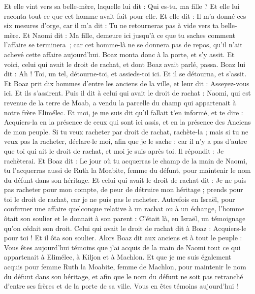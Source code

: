 \begin{multicols}{2}
Et elle vint vers sa belle-mère, laquelle lui dit : Qui es-tu, ma fille ? Et elle lui raconta tout ce que cet homme avait fait pour elle.
Et elle dit : Il m'a donné ces six mesures d'orge, car il m'a dit : Tu ne retourneras pas à vide vers ta belle-mère.
Et Naomi dit : Ma fille, demeure ici jusqu'à ce que tu saches comment l’affaire se terminera ; car cet homme-là ne se donnera pas de repos, qu'il n'ait achevé cette affaire aujourd'hui.
\VerseOne{}Boaz monta donc à la porte, et s'y assit. Et voici, celui qui avait le droit de rachat, et dont Boaz avait parlé, passa. Boaz lui dit : Ah ! Toi, un tel, détourne-toi, et assieds-toi ici. Et il se détourna, et s'assit.
Et Boaz prit dix hommes d'entre les anciens de la ville, et leur dit : Asseyez-vous ici. Et ils s'assirent.
Puis il dit à celui qui avait le droit de rachat : Naomi, qui est revenue de la terre de Moab, a vendu la parcelle du champ qui appartenait à notre frère Elimélec.
Et moi, je me suis dit qu'il fallait t'en informé, et te dire : Acquiers-la en la présence de ceux qui sont ici assis, et en la présence des Anciens de mon peuple. Si tu veux racheter par droit de rachat, rachète-la ; mais si tu ne veux pas la racheter, déclare-le moi, afin que je le sache : car il n'y a pas d'autre que toi qui ait le droit de rachat, et moi je suis après toi. Il répondit : Je rachèterai.
Et Boaz dit : Le jour où tu acquerras le champ de la main de Naomi, tu l'acquerras aussi de Ruth la Moabite, femme du défunt, pour maintenir le nom du défunt dans son héritage.
Et celui qui avait le droit de rachat dit : Je ne puis pas racheter pour mon compte, de peur de détruire mon héritage ; prends pour toi le droit de rachat, car je ne puis pas le racheter.
Autrefois en Israël, pour confirmer une affaire quelconque relative à un rachat ou à un échange, l'homme ôtait son soulier et le donnait à son parent : C'était là, en Israël, un témoignage qu'on cédait son droit.
Celui qui avait le droit de rachat dit à Boaz : Acquiers-le pour toi ! Et il ôta son soulier.
Alors Boaz dit aux anciens et à tout le peuple : Vous êtes aujourd'hui témoins que j'ai acquis de la main de Naomi tout ce qui appartenait à Elimélec, à Kiljon et à Machlon.
Et que je me suis également acquis pour femme Ruth la Moabite, femme de Machlon, pour maintenir le nom du défunt dans son héritage, et afin que le nom du défunt ne soit pas retranché d'entre ses frères et de la porte de sa ville. Vous en êtes témoins aujourd'hui !

\end{multicols}
